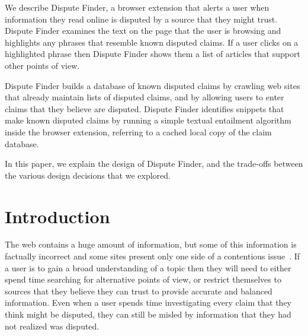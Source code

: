 \documentclass{www2010-submission}
\newcommand{\todo}[1]{}
\begin{document}
\abstract

We describe Dispute Finder, a browser extension that alerts a user when information they read online is disputed by a source that they might trust. Dispute Finder examines the text on the page that the user is browsing and highlights any phrases that resemble known disputed claims. If a user clicks on a highlighted phrase then Dispute Finder shows them a list of articles that support other points of view.

Dispute Finder builds a database of known disputed claims by crawling web sites that already maintain lists of disputed claims, and by allowing users to enter claims that they believe are disputed. Dispute Finder identifies snippets that make known disputed claims by running a simple textual entailment algorithm inside the browser extension, referring to a cached local copy of the claim database.

In this paper, we explain the design of Dispute Finder, and the trade-offs between the various design decisions that we explored. 






\section{Introduction}

\todo{update screenshots}
\todo{should this be spun as about news, or information in general}
\todo{need to talk more about what we know about people}
 

The web contains a huge amount of information, but some of this information is factually incorrect and some sites present only one side of a contentious issue~\cite{Herman2002}. If a user is to gain a broad understanding of a topic then they will need to either spend time searching for alternative points of view, or restrict themselves to sources that they believe they can trust to provide accurate and balanced information. Even when a user spends time investigating every claim that they think might be disputed, they can still be misled by information that they had not realized was disputed.
\end{document}
